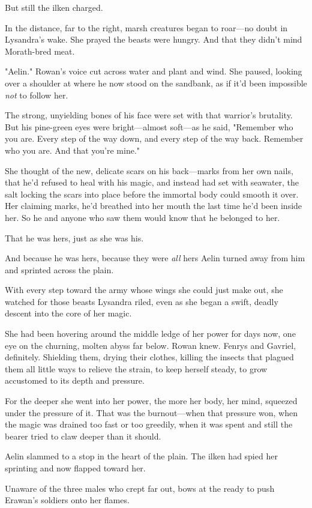 But still the ilken charged.

In the distance, far to the right, marsh creatures began to roar---no doubt in Lysandra's wake. She prayed the beasts were hungry. And that they didn't mind Morath-bred meat.

"Aelin." Rowan's voice cut across water and plant and wind. She paused, looking over a shoulder at where he now stood on the sandbank, as if it'd been impossible \emph{not} to follow her.

The strong, unyielding bones of his face were set with that warrior's brutality. But his pine-green eyes were bright---almost soft---as he said, "Remember who you are. Every step of the way down, and every step of the way back. Remember who you are. And that you're mine."

She thought of the new, delicate scars on his back---marks from her own nails, that he'd refused to heal with his magic, and instead had set with seawater, the salt locking the scars into place before the immortal body could smooth it over. Her claiming marks, he'd breathed into her mouth the last time he'd been inside her. So he and anyone who saw them would know that he belonged to her.

That he was hers, just as she was his.

And because he was hers, because they were \emph{all} hers 
Aelin turned away from him and sprinted across the plain.

With every step toward the army whose wings she could just make out, she watched for those beasts Lysandra riled, even as she began a swift, deadly descent into the core of her magic.

She had been hovering around the middle ledge of her power for days now, one eye on the churning, molten abyss far below. Rowan knew. Fenrys and Gavriel, definitely. Shielding them, drying their clothes, killing the insects that plagued them  all little ways to relieve the strain, to keep herself steady, to grow accustomed to its depth and pressure.

For the deeper she went into her power, the more her body, her mind, squeezed under the pressure of it. That was the burnout---when that pressure won, when the magic was drained too fast or too greedily, when it was spent and still the bearer tried to claw deeper than it should.

Aelin slammed to a stop in the heart of the plain. The ilken had spied her sprinting and now flapped toward her.

Unaware of the three males who crept far out, bows at the ready to push Erawan's soldiers onto her flames.

